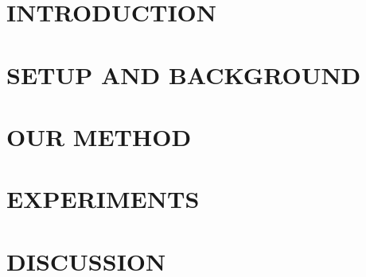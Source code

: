 \documentclass[twoside]{article}
\begin{document}
%

%


\begin{abstract}
  
\end{abstract}

\section{INTRODUCTION}
\label{sec:intro}


\section{SETUP AND BACKGROUND}
\label{sec:setup}


\section{OUR METHOD}
\label{sec:method}


\section{EXPERIMENTS}
\label{sec:experiments-main}


\section{DISCUSSION}
\label{sec:discussion}

\end{document}
